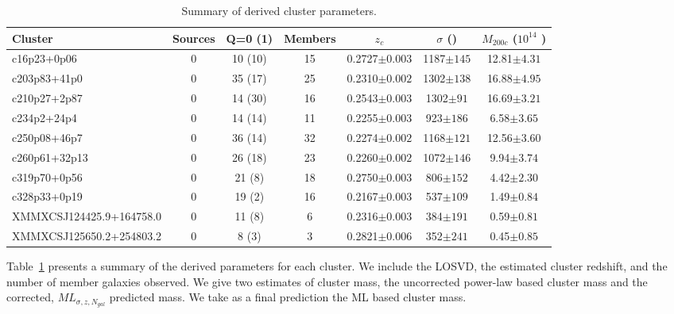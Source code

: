 \begin{table}
	\centering 
	\caption{Summary of derived cluster parameters.} 
	\begin{tabular}
		{lcccccc} \hline Cluster & Sources & Q=0 (1) & Members & $z_{c}$ & $\sigma$ (\kms) & $M_{200c}$ ($10^{14}$ \Msol) \\
		\hline \hline 
		c16p23+0p06 & 0 & 10 (10) & 15 & 0.2727$\pm{0.003}$ & 1187$\pm{145}$ & 12.81$\pm{4.31}$ \\
		c203p83+41p0 & 0 & 35 (17) & 25 & 0.2310$\pm{0.002}$ & 1302$\pm{138}$ & 16.88$\pm{4.95}$ \\
		c210p27+2p87 & 0 & 14 (30) & 16 & 0.2543$\pm{0.003}$ & 1302$\pm{91}$ & 16.69$\pm{3.21}$ \\
		c234p2+24p4 & 0 & 14 (14) & 11 & 0.2255$\pm{0.003}$ & 923$\pm{186}$ & 6.58$\pm{3.65}$ \\
		c250p08+46p7 & 0 & 36 (14) & 32 & 0.2274$\pm{0.002}$ & 1168$\pm{121}$ & 12.56$\pm{3.60}$ \\
		c260p61+32p13 & 0 & 26 (18) & 23 & 0.2260$\pm{0.002}$ & 1072$\pm{146}$ & 9.94$\pm{3.74}$ \\
		c319p70+0p56 & 0 & 21 (8) & 18 & 0.2750$\pm{0.003}$ & 806$\pm{152}$ & 4.42$\pm{2.30}$ \\
		c328p33+0p19 & 0 & 19 (2) & 16 & 0.2167$\pm{0.003}$ & 537$\pm{109}$ & 1.49$\pm{0.84}$ \\
		XMMXCSJ124425.9+164758.0 & 0 & 11 (8) & 6 & 0.2316$\pm{0.003}$ & 384$\pm{191}$ & 0.59$\pm{0.81}$ \\
		XMMXCSJ125650.2+254803.2 & 0 & 8 (3) & 3 & 0.2821$\pm{0.006}$ & 352$\pm{241}$ & 0.45$\pm{0.85}$ \\
		\hline 
	\end{tabular}
	\label{tbl: derived parameters} 
\end{table}

Table~\ref{tbl: derived parameters} presents a summary of the derived parameters for each cluster. We include the LOSVD, the estimated cluster redshift, and the number of member galaxies observed. We give two estimates of cluster mass, the uncorrected power-law based cluster mass and the corrected, $ML_{\sigma, z, N_{gal}}$ predicted mass. We take as a final prediction the ML based cluster mass.

